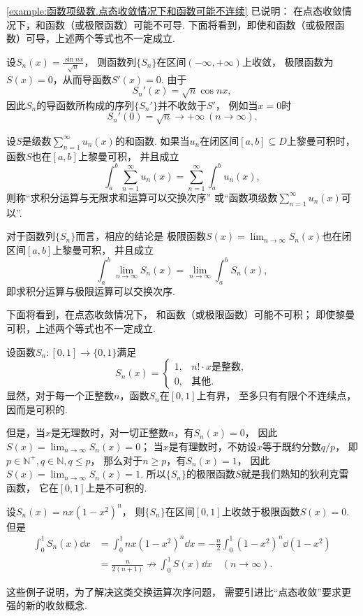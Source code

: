 \cref{example:函数项级数.点态收敛情况下和函数可能不连续} 已说明：
在点态收敛情况下，和函数（或极限函数）可能不可导.
下面将看到，即使和函数（或极限函数）可导，上述两个等式也不一定成立.
\begin{example}
设\(S_n(x) = \frac{\sin nx}{\sqrt{n}}\)，
则函数列\(\{S_n\}\)在区间\((-\infty,+\infty)\)上收敛，
极限函数为\(S(x) = 0\)，从而导函数\(S'(x) = 0\).
由于\[
	S_n'(x) = \sqrt{n} \cos nx,
\]
因此\(S_n\)的导函数所构成的序列\(\{S_n'\}\)并不收敛于\(S'\)，
例如当\(x=0\)时\[
	S_n'(0) = \sqrt{n}\to+\infty\ (n\to\infty).
\]
\end{example}

\begin{definition}
设\(S\)是级数\(\sum_{n=1}^\infty u_n(x)\)的和函数.
如果当\(u_n\)在闭区间\([a,b] \subseteq D\)上黎曼可积时，函数\(S\)也在\([a,b]\)上黎曼可积，
并且成立\[
	\int_a^b \sum_{n=1}^\infty u_n(x)
	= \sum_{n=1}^\infty \int_a^b u_n(x),
\]
则称“求积分运算与无限求和运算可以交换次序”
或“函数项级数\(\sum_{n=1}^\infty u_n(x)\)可以”.
\end{definition}
对于函数列\(\{S_n\}\)而言，相应的结论是
极限函数\(S(x) = \lim_{n\to\infty} S_n(x)\)也在闭区间\([a,b]\)上黎曼可积，
并且成立\[
	\int_a^b \lim_{n\to\infty} S_n(x)
	= \lim_{n\to\infty} \int_a^b S_n(x),
\]
即求积分运算与极限运算可以交换次序.

下面将看到，在点态收敛情况下，
和函数（或极限函数）可能不可积；
即使黎曼可积，上述两个等式也不一定成立.
\begin{example}
设函数\(S_n\colon[0,1]\to\{0,1\}\)满足\[
	S_n(x) = \left\{ \begin{array}{cl}
		1, & \text{$n! \cdot x$是整数},  \\
		0, & \text{其他}.
	\end{array} \right.
\]
显然，对于每一个正整数\(n\)，函数\(S_n\)在\([0,1]\)上有界，
至多只有有限个不连续点，因而是可积的.

但是，当\(x\)是无理数时，对一切正整数\(n\)，有\(S_n(x) = 0\)，
因此\(S(x) = \lim_{n\to\infty} S_n(x) = 0\)；
当\(x\)是有理数时，不妨设\(x\)等于既约分数\(q/p\)，
即\(p\in\mathbb{N}^+,
q\in\mathbb{N},
q \leq p\)，
那么对于\(n \geq p\)，有\(S_n(x) = 1\)，
因此\(S(x) = \lim_{n\to\infty} S_n(x) = 1\).
所以\(\{S_n\}\)的极限函数\(S\)就是我们熟知的狄利克雷函数，
它在\([0,1]\)上是不可积的.
\end{example}
\begin{example}
设\(S_n(x) = nx(1-x^2)^n\)，
则\(\{S_n\}\)在区间\([0,1]\)上收敛于极限函数\(S(x) = 0\).
但是\begin{align*}
	\int_0^1 S_n(x) \dd{x}
	&= \int_0^1 n x (1-x^2)^n \dd{x}
	= -\frac{n}{2} \int_0^1 (1-x^2)^n \dd(1-x^2) \\
	&= \frac{n}{2(n+1)}
	\not\to \int_0^1 S(x) \dd{x}
	\quad(n\to\infty).
\end{align*}
\end{example}
这些例子说明，为了解决这类交换运算次序问题，
需要引进比“点态收敛”要求更强的新的收敛概念.

